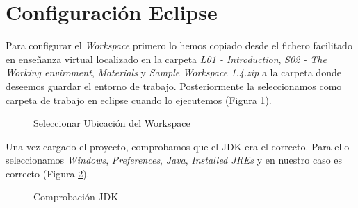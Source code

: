 \documentclass{scrartcl}
\begin{document}
\section{Configuración Eclipse}
Para configurar el \textit{Workspace} primero lo hemos copiado desde el fichero facilitado en \href{htps://ev.us.es/}{enseñanza virtual} localizado en la carpeta \textit{L01 - Introduction}, \textit{S02 - The Working enviroment}, \textit{Materials} y \textit{Sample Workspace 1.4.zip} a la carpeta donde deseemos guardar el entorno de trabajo. Posteriormente la seleccionamos como carpeta de trabajo en eclipse cuando lo ejecutemos (Figura \ref{fig:ConfEcl01}).

\begin{figure}[H]
	
	\centering
	\caption{Seleccionar Ubicación del Workspace}
	\label{fig:ConfEcl01}
	
\end{figure}

Una vez cargado el proyecto, comprobamos que el JDK era el correcto. Para ello seleccionamos \textit{Windows}, \textit{Preferences}, \textit{Java}, \textit{Installed JREs} y en nuestro caso es correcto (Figura \ref{fig:ConfEcl02}).
\begin{figure}[H]
	
	\centering
	\caption{Comprobación JDK}
	\label{fig:ConfEcl02}
	
\end{figure}
\end{document}
